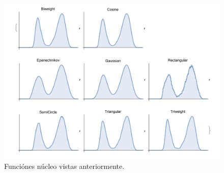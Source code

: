 \begin{figure}[H]
    \centering
    \includegraphics[width=1\textwidth]{imagenes6/nucleo3.png}
    \caption{Funciónes núcleo vistas anteriormente.}
\end{figure}